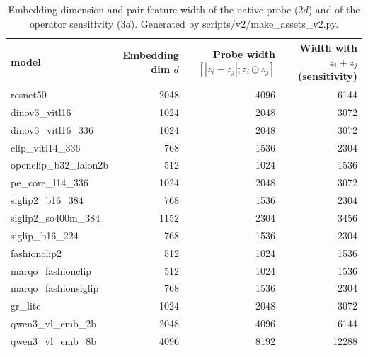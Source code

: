 \begin{table}[t]\centering\small
\caption{Embedding dimension and pair-feature width of the native probe (2$d$) and of the operator sensitivity (3$d$). Generated by scripts/v2/make\_assets\_v2.py.}\label{tab:v2-feature-width}
\begin{tabular}{lrrr}\toprule
model & Embedding dim $d$ & Probe width $[|z_i-z_j|; z_i\odot z_j]$ & Width with $z_i+z_j$ (sensitivity) \\\midrule
resnet50 & 2048 & 4096 & 6144 \\
dinov3\_vitl16 & 1024 & 2048 & 3072 \\
dinov3\_vitl16\_336 & 1024 & 2048 & 3072 \\
clip\_vitl14\_336 & 768 & 1536 & 2304 \\
openclip\_b32\_laion2b & 512 & 1024 & 1536 \\
pe\_core\_l14\_336 & 1024 & 2048 & 3072 \\
siglip2\_b16\_384 & 768 & 1536 & 2304 \\
siglip2\_so400m\_384 & 1152 & 2304 & 3456 \\
siglip\_b16\_224 & 768 & 1536 & 2304 \\
fashionclip2 & 512 & 1024 & 1536 \\
marqo\_fashionclip & 512 & 1024 & 1536 \\
marqo\_fashionsiglip & 768 & 1536 & 2304 \\
gr\_lite & 1024 & 2048 & 3072 \\
qwen3\_vl\_emb\_2b & 2048 & 4096 & 6144 \\
qwen3\_vl\_emb\_8b & 4096 & 8192 & 12288 \\
\bottomrule\end{tabular}
\end{table}
